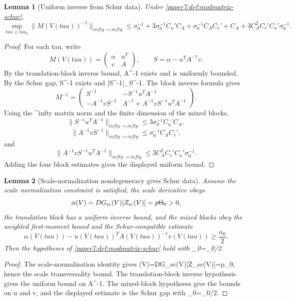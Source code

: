 \documentclass[11pt]{amsart}
\def\({}%
\def\){}%
\def\tau{tau}%
\def\infty{infty}%
\theoremstyle{plain}
\newtheorem{lemma}[lemma]{Lemma}
\theoremstyle{definition}
\theoremstyle{remark}
\begin{document}
\begin{lemma}[Uniform inverse from Schur data]\label{paper7:lem:modmatrix-inverse}
Under \cref{paper7:def:modmatrix-schur},
\[
  \sup_{\tau\ge\tau_0}\|M(V(\tau))^{-1}\|_{\infty\to\infty}
  \le
  \sigma_0^{-1}
  +3\sigma_0^{-1}C_u'C_A
  +\sigma_0^{-1}C_A C_v'
  +C_A
  +3C_A^2C_v'C_u'\sigma_0^{-1}.
\]
\end{lemma}

\begin{proof}
For each \(\tau\), write
\[
  M(V(\tau))=
  \begin{pmatrix}
  \alpha&u^T\\
  v&A
  \end{pmatrix},
  \qquad
  S=\alpha-u^TA^{-1}v.
\]
By the translation-block inverse bound, \(A^{-1}\) exists and is uniformly
bounded.  By the Schur gap, \(S^{-1}\) exists and
\(|S^{-1}|\le\sigma_0^{-1}\).  The block inverse formula gives
\[
  M^{-1}=
  \begin{pmatrix}
  S^{-1} & -S^{-1}u^TA^{-1}\\
  -A^{-1}vS^{-1} & A^{-1}+A^{-1}vS^{-1}u^TA^{-1}
  \end{pmatrix}.
\]
Using the \(\ell^\infty\) matrix norm and the finite dimension of the mixed
blocks,
\[
  \|S^{-1}u^TA^{-1}\|_{\infty\to\infty}
  \le 3\sigma_0^{-1}C_u'C_A,
\]
\[
  \|A^{-1}vS^{-1}\|_{\infty\to\infty}
  \le \sigma_0^{-1}C_A C_v',
\]
and
\[
  \|A^{-1}vS^{-1}u^TA^{-1}\|_{\infty\to\infty}
  \le 3C_A^2C_v'C_u'\sigma_0^{-1}.
\]
Adding the four block estimates gives the displayed uniform bound.
\end{proof}

\begin{lemma}[Scale-normalization nondegeneracy gives Schur data]
\label{paper7:lem:gauge-nondeg-schur}
Assume the scale normalization constraint is satisfied, the scale derivative obeys
\[
  \alpha(V)=DG_{\rm sc}(V)[Z_{\rm sc}(V)]=p\Theta_0>0,
\]
the translation block has a uniform inverse bound, and the mixed blocks obey
the weighted first-moment bound and the Schur-compatible estimate
\[
  \alpha(V(\tau))-u(V(\tau))^TA(V(\tau))^{-1}v(V(\tau))
  \ge \frac{\alpha_0}{2}.
\]
Then the hypotheses of \cref{paper7:def:modmatrix-schur} hold with
\(\sigma_0=\alpha_0/2\).
\end{lemma}

\begin{proof}
The scale-normalization identity gives
\(\alpha(V)=DG_{\rm sc}(V)[Z_{\rm sc}(V)]=p\Theta_0\), hence the scale
transversality bound.  The translation-block inverse hypothesis gives the
uniform bound on \(A^{-1}\).  The mixed-block hypotheses give the bounds on
\(u\) and \(v\), and the displayed estimate is the Schur gap with
\(\sigma_0=\alpha_0/2\).
\end{proof}
\end{document}
